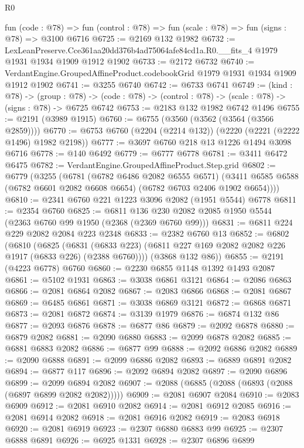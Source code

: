 \begin{lexlean}{R0}
\begin{coremodule}
  fun (code : @78) => fun (control : @78) => fun (scale : @78) => fun (signs : @78) => @3100 @6716
@6725 := @2169 @132 @1982
@6732 := LexLeanPreserve.Cce361aa20dd376b4ad75064afe84cd1a.R0.__fits_4
    @1979
    @1931
    @1934
    @1909
    @1912
    @1902
@6733 := @2172 @6732
@6740 := VerdantEngine.GroupedAffineProduct.codebookGrid @1979 @1931 @1934 @1909 @1912 @1902
@6741 := @3255 @6740
@6742 := @6733 @6741
@6749 := (kind : @78) ->
  (group : @78) -> (code : @78) -> (control : @78) -> (scale : @78) -> (signs : @78) -> @6725 @6742
@6753 := @2183 @132 @1982 @6742 @1496
@6755 := @2191 (@3989 @1915)
@6760 := @6755 (@3560 (@3562 (@3564 (@3566 @2859))))
@6770 := @6753 @6760 (@2204 (@2214 @132)) (@2220 (@2221 (@2222 @1496) @1982 @2198))
@6777 := @3697 @6760 @218 @13 @1226 @1494 @3098 @6716
@6778 := @140 @6492
@6779 := @6777 @6778
@6781 := @3411 @6472 @6475
@6782 := VerdantEngine.GroupedAffineProduct.Step.grid
@6802 := @6779
    (@3255
      (@6781
        (@6782 @6486 @2082 @6555 @6571)
        (@3411 @6585 @6588 (@6782 @6601 @2082 @6608 @6654) (@6782 @6703 @2406 @1902 @6654))))
@6810 := @2341 @6760 @221 @1223 @3096 @2082 (@1951 @5544) @6778
@6811 := @2354 @6760
@6825 := @6811 @136 @230 @2082 @2085 @1950 @5544 (@2363 @6760 @99 @1950 (@2368 (@2369 @6760 @99)))
@6831 := @6811 @224 @229 @2082 @2084 @223 @2348
@6833 := @2382 @6760 @13
@6852 := @6802
    (@6810
      (@6825
        (@6831 (@6833 @223) (@6811 @227 @169 @2082 @2082 @226 @1917 (@6833 @226) (@2388 @6760))))
      (@3868 @132 @86))
@6855 := @2191 (@4223 @6778) @6760
@6860 := @2230 @6855 @1148 @1392 @1493 @2087
@6861 := @5102 @1931
@6863 := @3038 @6861 @3121
@6864 := @2086 @6863
@6866 := @2081 @6864 @2082
@6867 := @2083 @6866
@6868 := @2081 @6867
@6869 := @6485 @6861
@6871 := @3038 @6869 @3121
@6872 := @6868 @6871
@6873 := @2081 @6872
@6874 := @3139 @1979
@6876 := @6874 @132 @86
@6877 := @2093 @6876
@6878 := @6877 @86
@6879 := @2092 @6878
@6880 := @6879 @2082
@6881 := @2090 @6880
@6883 := @2099 @6878 @2082
@6885 := @6881 @6883 @2082
@6886 := @6877 @99
@6888 := @2092 @6886 @2082
@6889 := @2090 @6888
@6891 := @2099 @6886 @2082
@6893 := @6889 @6891 @2082
@6894 := @6877 @117
@6896 := @2092 @6894 @2082
@6897 := @2090 @6896
@6899 := @2099 @6894 @2082
@6907 := @2088 (@6885 (@2088 (@6893 (@2088 (@6897 @6899 @2082 @2082)))))
@6909 := @2081 @6907 @2084
@6910 := @2083 @6909
@6912 := @2081 @6910 @2082
@6914 := @2081 @6912 @2085
@6916 := @2081 @6914 @2082
@6918 := @2081 @6916 @2082
@6919 := @2083 @6918
@6920 := @2081 @6919
@6923 := @2307 @6880 @6883 @99
@6925 := @2307 @6888 @6891
@6926 := @6925 @1331
@6928 := @2307 @6896 @6899

\end{coremodule}
\end{lexlean}
